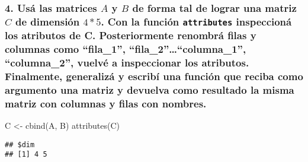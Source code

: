 \documentclass[
]{article}
\newenvironment{Shaded}{\begin{snugshade}}{\end{snugshade}}
\newcommand{\FunctionTok}[1]{\textcolor[rgb]{0.00,0.00,0.00}{#1}}
\newcommand{\NormalTok}[1]{#1}
\newcommand{\OtherTok}[1]{\textcolor[rgb]{0.56,0.35,0.01}{#1}}
\begin{document}
\hypertarget{usuxe1-las-matrices-a-y-b-de-forma-tal-de-lograr-una-matriz-c-de-dimensiuxf3n-45.-con-la-funciuxf3n-attributes-inspeccionuxe1-los-atributos-de-c.-posteriormente-renombruxe1-filas-y-columnas-como-fila_1-fila_2columna_1-columna_2-vuelvuxe9-a-inspeccionar-los-atributos.-finalmente-generalizuxe1-y-escribuxed-una-funciuxf3n-que-reciba-como-argumento-una-matriz-y-devuelva-como-resultado-la-misma-matriz-con-columnas-y-filas-con-nombres.}{%
\subsubsection{\texorpdfstring{4. Usá las matrices \(A\) y \(B\) de
forma tal de lograr una matriz \(C\) de dimensión \(4*5\). Con la
función \texttt{attributes} inspeccioná los atributos de C.
Posteriormente renombrá filas y columnas como ``fila\_1'',
``fila\_2''\ldots{}``columna\_1'', ``columna\_2'', vuelvé a inspeccionar
los atributos. Finalmente, generalizá y escribí una función que reciba
como argumento una matriz y devuelva como resultado la misma matriz con
columnas y filas con
nombres.}{4. Usá las matrices A y B de forma tal de lograr una matriz C de dimensión 4*5. Con la función attributes inspeccioná los atributos de C. Posteriormente renombrá filas y columnas como ``fila\_1'', ``fila\_2''\ldots``columna\_1'', ``columna\_2'', vuelvé a inspeccionar los atributos. Finalmente, generalizá y escribí una función que reciba como argumento una matriz y devuelva como resultado la misma matriz con columnas y filas con nombres.}}\label{usuxe1-las-matrices-a-y-b-de-forma-tal-de-lograr-una-matriz-c-de-dimensiuxf3n-45.-con-la-funciuxf3n-attributes-inspeccionuxe1-los-atributos-de-c.-posteriormente-renombruxe1-filas-y-columnas-como-fila_1-fila_2columna_1-columna_2-vuelvuxe9-a-inspeccionar-los-atributos.-finalmente-generalizuxe1-y-escribuxed-una-funciuxf3n-que-reciba-como-argumento-una-matriz-y-devuelva-como-resultado-la-misma-matriz-con-columnas-y-filas-con-nombres.}}

\begin{Shaded}
\begin{Highlighting}[]
\NormalTok{  C }\OtherTok{\textless{}{-}} \FunctionTok{cbind}\NormalTok{(A, B)}
  \FunctionTok{attributes}\NormalTok{(C)}
\end{Highlighting}
\end{Shaded}

\begin{verbatim}
## $dim
## [1] 4 5
\end{verbatim}
\end{document}
